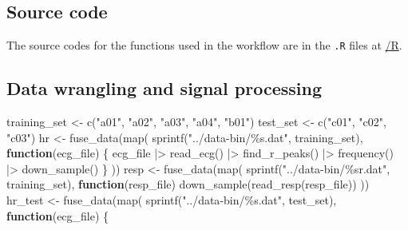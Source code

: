 \documentclass[
]{article}
\newenvironment{Shaded}{\begin{snugshade}}{\end{snugshade}}
\newcommand{\ControlFlowTok}[1]{\textcolor[rgb]{0.13,0.29,0.53}{\textbf{#1}}}
\newcommand{\FunctionTok}[1]{\textcolor[rgb]{0.00,0.00,0.00}{#1}}
\newcommand{\NormalTok}[1]{#1}
\newcommand{\OtherTok}[1]{\textcolor[rgb]{0.56,0.35,0.01}{#1}}
\newcommand{\SpecialCharTok}[1]{\textcolor[rgb]{0.00,0.00,0.00}{#1}}
\newcommand{\StringTok}[1]{\textcolor[rgb]{0.31,0.60,0.02}{#1}}
\begin{document}
\hypertarget{source-code}{%
\subsection{Source code}\label{source-code}}

The source codes for the functions used in the workflow are in the
\texttt{.R} files at
\href{https://github.com/szmsu2011/comp90072/blob/main/R}{/R}.

\hypertarget{data-wrangling-and-signal-processing}{%
\subsection{Data wrangling and signal
processing}\label{data-wrangling-and-signal-processing}}

\begin{Shaded}
\begin{Highlighting}[]
\NormalTok{training\_set }\OtherTok{\textless{}{-}} \FunctionTok{c}\NormalTok{(}\StringTok{"a01"}\NormalTok{, }\StringTok{"a02"}\NormalTok{, }\StringTok{"a03"}\NormalTok{, }\StringTok{"a04"}\NormalTok{, }\StringTok{"b01"}\NormalTok{)}
\NormalTok{test\_set }\OtherTok{\textless{}{-}} \FunctionTok{c}\NormalTok{(}\StringTok{"c01"}\NormalTok{, }\StringTok{"c02"}\NormalTok{, }\StringTok{"c03"}\NormalTok{)}
\NormalTok{hr }\OtherTok{\textless{}{-}} \FunctionTok{fuse\_data}\NormalTok{(}\FunctionTok{map}\NormalTok{(}
  \FunctionTok{sprintf}\NormalTok{(}\StringTok{"../data{-}bin/\%s.dat"}\NormalTok{, training\_set),}
  \ControlFlowTok{function}\NormalTok{(ecg\_file) \{}
\NormalTok{    ecg\_file }\SpecialCharTok{|\textgreater{}}
      \FunctionTok{read\_ecg}\NormalTok{() }\SpecialCharTok{|\textgreater{}}
      \FunctionTok{find\_r\_peaks}\NormalTok{() }\SpecialCharTok{|\textgreater{}}
      \FunctionTok{frequency}\NormalTok{() }\SpecialCharTok{|\textgreater{}}
      \FunctionTok{down\_sample}\NormalTok{()}
\NormalTok{  \}}
\NormalTok{))}
\NormalTok{resp }\OtherTok{\textless{}{-}} \FunctionTok{fuse\_data}\NormalTok{(}\FunctionTok{map}\NormalTok{(}
  \FunctionTok{sprintf}\NormalTok{(}\StringTok{"../data{-}bin/\%sr.dat"}\NormalTok{, training\_set),}
  \ControlFlowTok{function}\NormalTok{(resp\_file) }\FunctionTok{down\_sample}\NormalTok{(}\FunctionTok{read\_resp}\NormalTok{(resp\_file))}
\NormalTok{))}
\NormalTok{hr\_test }\OtherTok{\textless{}{-}} \FunctionTok{fuse\_data}\NormalTok{(}\FunctionTok{map}\NormalTok{(}
  \FunctionTok{sprintf}\NormalTok{(}\StringTok{"../data{-}bin/\%s.dat"}\NormalTok{, test\_set),}
  \ControlFlowTok{function}\NormalTok{(ecg\_file) \{}

\end{Highlighting}
\end{Shaded}
\end{document}
